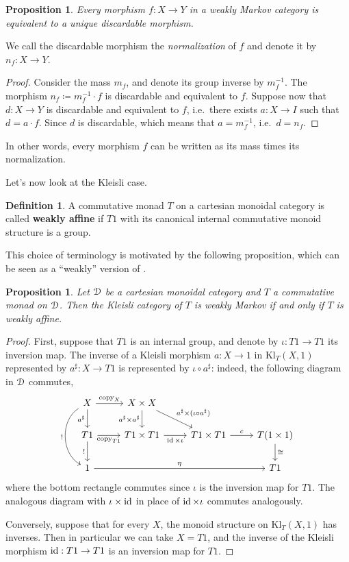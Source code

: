 \documentclass[a4paper,UKenglish,numberwithinsect,cleveref, autoref, thm-restate]{lipics-v2021}
\theoremstyle{plain} %
\newtheorem{myproposition}[mytheorem]{Proposition}
\theoremstyle{definition} %
\newtheorem{mydefinition}[mytheorem]{Definition}
\begin{document}
\begin{myproposition}\label{weaklydiscardable}
 Every morphism $f:X\to Y$ in a weakly Markov category is equivalent to a unique discardable morphism.
\end{myproposition}
We call the discardable morphism the \emph{normalization} of $f$ and denote it by $n_f:X\to Y$.
\begin{proof}
 Consider the mass $m_f$, and denote its group inverse by $m_f^{-1}$. The morphism $n_f\coloneqq m_f^{-1}\cdot f$ is discardable and equivalent to $f$.
 Suppose now that $d:X\to Y$ is discardable and equivalent to $f$, i.e.~there exists $a:X\to I$ such that $d = a\cdot f$. 
 Since $d$ is discardable,
 which means that $a=m_f^{-1}$, i.e.~$d=n_f$. 
\end{proof}
In other words, every morphism $f$ can be written as its mass times its normalization. 

Let's now look at the Kleisli case.

\begin{mydefinition}\label{defweaklyaffine}
 A commutative monad $T$ on a cartesian monoidal category is called \textbf{weakly affine} if $T1$ with its canonical internal commutative monoid structure is a group.
\end{mydefinition}

This choice of terminology is motivated by the following proposition, which can be seen as a ``weakly'' version of .

\begin{myproposition}\label{weaklyboth}
 Let $\mathcal{D}$ be a cartesian monoidal category and $T$ a commutative monad on $\mathcal{D}$. Then the Kleisli category of $T$ is weakly Markov if and only if $T$ is weakly affine.
\end{myproposition}
\begin{proof}
 First, suppose that $T1$ is an internal group, and denote by $\iota:T1\to T1$ its inversion map. 
 The inverse of a Kleisli morphism $a : X \to 1$ in $\mathrm{Kl}_T(X,1)$ represented by $a^\sharp:X\to T1$ is represented by $\iota\circ a^\sharp$: indeed, the following diagram in $\mathcal{D}$ commutes,
 \[
  \begin{tikzcd}
  X \ar[bend right=5pc]{dd}[swap]{!} \ar{d}[swap]{a^\sharp} \ar{r}{\mathrm{copy}_X} & X\times X \ar{d}[swap]{a^\sharp\times a^\sharp} \ar{dr}{a^\sharp\times(\iota\circ a^\sharp)} \\
  T1 \ar{d}[swap]{!} \ar{r}[swap]{\mathrm{copy}_{T1}} & T1\times T1 \ar{r}[swap]{\id\times\iota} & T1\times T1 \ar{r}{c} & T(1\times 1) \ar{d}{\cong} \\
  1 \ar{rrr}{\eta} &&& T1
  \end{tikzcd}
 \]
 where the bottom rectangle commutes since $\iota$ is the inversion map for $T1$. The analogous diagram with $\iota\times\operatorname{ id}$ in place of $\operatorname{ id}\times\iota$ commutes analogously.
 
 Conversely, suppose that for every $X$, the monoid structure on $\mathrm{Kl}_T(X,1)$ has inverses. Then in particular we can take $X=T1$, and the inverse of the Kleisli morphism $\operatorname{ id}:T1\to T1$ is an inversion map for $T1$. 
\end{proof}
\end{document}

